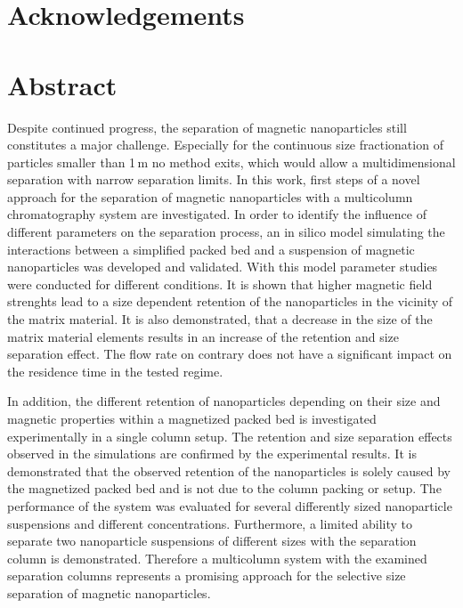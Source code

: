 \chapter{Acknowledgements}
\label{ch:Acknowledgements}


\newpage

\chapter{Abstract}
\label{ch:abstract_en}

Despite continued progress, the separation of magnetic nanoparticles still constitutes a major challenge. Especially for the continuous size fractionation of particles smaller than 1\,\textmu m no method exits, which would allow a multidimensional separation with narrow separation limits. In this work, first steps of a novel approach for the separation of magnetic nanoparticles with a multicolumn chromatography system are investigated. In order to identify the influence of different parameters on the separation process, an in silico model simulating the interactions between a simplified packed bed and a suspension of magnetic nanoparticles was developed and validated. With this model parameter studies were conducted for different conditions. It is shown that higher magnetic field strenghts lead to a size dependent retention of the nanoparticles in the vicinity of the matrix material. It is also demonstrated, that a decrease in the size of the matrix material elements results in an increase of the retention and size separation effect. The flow rate on contrary does not have a significant impact on the residence time in the tested regime.  

In addition, the different retention of nanoparticles depending on their size and magnetic properties within a magnetized packed bed is investigated experimentally in a single column setup. The retention and size separation effects observed in the simulations are confirmed by the experimental results. It is demonstrated that the observed retention of the nanoparticles is solely caused by the magnetized packed bed and is not due to the column packing or setup. The performance of the system was evaluated for several differently sized nanoparticle suspensions and different concentrations. Furthermore, a limited ability to separate two nanoparticle suspensions of different sizes with the separation column is demonstrated. Therefore a multicolumn system with the examined separation columns represents a promising approach for the selective size separation of magnetic nanoparticles.


